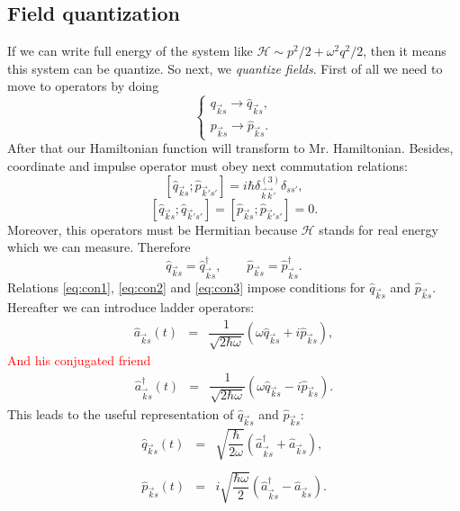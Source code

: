 	\subsection{Field quantization}
	
	If we can write full energy of the system like $\mathscr{H} \sim p^2/2 + \omega^2 q^2/2$, then it means this system can be quantize.  So next, we  \textit{quantize fields}. First of all we need to move to operators by doing
	\begin{equation}
		\begin{cases}
		q_{\vec{k}s} \to \hat{q}_{\vec{k}s}, \\
		p_{\vec{k}s} \to \hat{p}_{\vec{k}s}.
		\end{cases}
	\end{equation}
	After that our Hamiltonian function will transform to Mr. Hamiltonian.
	Besides, coordinate and impulse operator must obey next commutation relations:
	\begin{equation}
		\left[\hat{q}_{\vec{k}s} ; \hat{p}_{\vec{k}'s'} \right] = i \hbar \delta^{(3)}_{\vec{k}\vec{k}'} \delta_{ss'},
		\label{eq:con1}
	\end{equation}
	\begin{equation}
		\left[\hat{q}_{\vec{k}s} ; \hat{q}_{\vec{k}'s'} \right] = \left[\hat{p}_{\vec{k}s} ; \hat{p}_{\vec{k}'s'} \right] = 0.
		\label{eq:con2}
	\end{equation}
	Moreover, this operators must be Hermitian because $\mathscr{H}$ stands for real energy which we can measure. Therefore
	\begin{equation}
		\hat{q}_{\vec{k}s} = \hat{q}^{\dagger}_{\vec{k}s}, \qquad \hat{p}_{\vec{k}s} = \hat{p}^{\dagger}_{\vec{k}s}.
		\label{eq:con3}
	\end{equation}
	Relations \eqref{eq:con1}, \eqref{eq:con2} and \eqref{eq:con3} impose conditions for $\hat{q}_{\vec{k}s}$ and $\hat{p}_{\vec{k}s}$.
	Hereafter we can introduce ladder operators:
	\begin{eqnarray}
		\hat{a}_{\vec{k}s}(t) &=& \dfrac{1}{\sqrt{2 \hbar \omega}} \left( \omega \hat{q}_{\vec{k}s} + i \hat{p}_{\vec{k}s} \right), %
	\end{eqnarray}
	{\textcolor{red}{ And his conjugated friend }} 
	\begin{eqnarray}
		\hat{a}^{\dagger}_{\vec{k}s}(t) &=& \dfrac{1}{\sqrt{2 \hbar \omega}} \left( \omega \hat{q}_{\vec{k}s} - i \hat{p}_{\vec{k}s} \right).
	\end{eqnarray}
	This leads to the useful representation of $\hat{q}_{\vec{k}s}$ and $\hat{p}_{\vec{k}s}$:
	\begin{eqnarray}
		\hat{q}_{\vec{k}s}(t) &=& \sqrt{\dfrac{\hbar}{2 \omega}} \left( \hat{a}^{\dagger}_{\vec{k}s} +  \hat{a}_{\vec{k}s} \right), \\ \nonumber \\
		\hat{p}_{\vec{k}s}(t) &=& i \sqrt{\dfrac{\hbar \omega}{2}} \left( \hat{a}^{\dagger}_{\vec{k}s} -  \hat{a}_{\vec{k}s} \right).
	\end{eqnarray}
	
